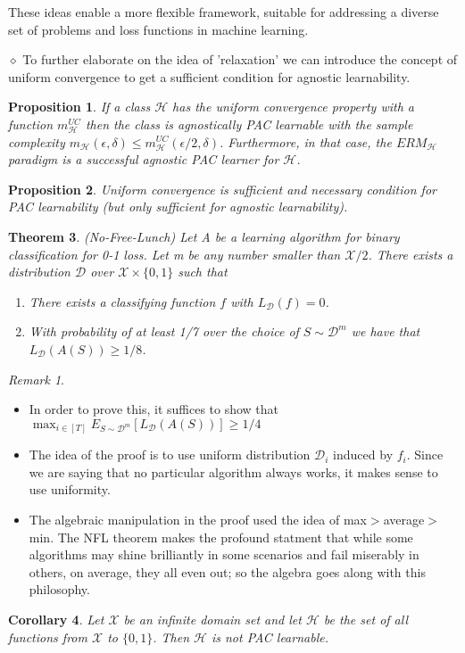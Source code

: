 \documentclass{article}
\newtheorem{theorem}{Theorem}
\newtheorem{proposition}[theorem]{Proposition}
\newtheorem{corollary}[theorem]{Corollary}
\theoremstyle{remark}
\newtheorem{remark}[example]{Remark}
\begin{document}
    These ideas enable a more flexible framework, suitable for addressing a diverse set of problems and loss functions in machine learning.

    $\diamond$ To further elaborate on the idea of 'relaxation' we can introduce the concept of uniform convergence to get a sufficient condition for agnostic learnability.

    \begin{proposition}
    If a class $\mathcal{H}$ has the uniform convergence property with a function $m^{UC}_{\mathcal{H}}$ then the class is agnostically
     PAC learnable with the sample complexity $m_{\mathcal{H}}(\epsilon,\delta)\leq m^{UC}_{\mathcal{H}}(\epsilon/2,\delta)$. Furthermore, in that case, the $ERM_{\mathcal{H}}$ paradigm is a successful 
     agnostic PAC learner for $\mathcal{H}$.
    \end{proposition}
    \begin{proposition}
    Uniform convergence is sufficient and necessary condition for PAC learnability (but only sufficient for agnostic learnability).
    \end{proposition}

    \begin{theorem}
    (No-Free-Lunch) Let A be a learning algorithm for binary classification for 0-1 loss. Let m be any number smaller than $\mathcal{X}/2$. There exists 
    a distribution $\mathcal{D}$ over $\mathcal{X}\times\{0,1\}$ such that 
    \begin{enumerate}
    \item There exists a classifying function $f$ with $L_\mathcal{D}(f)=0$.
    \item With probability of at least 1/7 over the choice of $S\sim \mathcal{D}^m$ we have that $L_{\mathcal{D}}(A(S))\geq 1/8$.
    \end{enumerate}
    \end{theorem}
    \begin{remark}
    \begin{itemize}
    \item In order to prove this, it suffices to show that $\max_{i\in[T]} E_{S\sim\mathcal{D}^m}[L_\mathcal{D}(A(S))]\geq 1/4$
    \item The idea of the proof is to use uniform distribution $\mathcal{D}_i$ induced by $f_i$. Since we are saying that no particular algorithm always works, it makes sense to use uniformity.
    \item The algebraic manipulation in the proof used the idea of max$>$average$>$min. The NFL theorem makes the profound
     statment that while some algorithms may shine brilliantly in some scenarios and fail miserably in others, on average, they all even out; so the 
     algebra goes along with this philosophy. 
    \end{itemize}
    \end{remark}
    \begin{corollary}
    Let $\mathcal{X}$ be an infinite domain set and let $\mathcal{H}$ be the set of all functions from $\mathcal{X}$ to $\{0,1\}$. Then $\mathcal{H}$ is not PAC learnable.
    \end{corollary}
\end{document}
